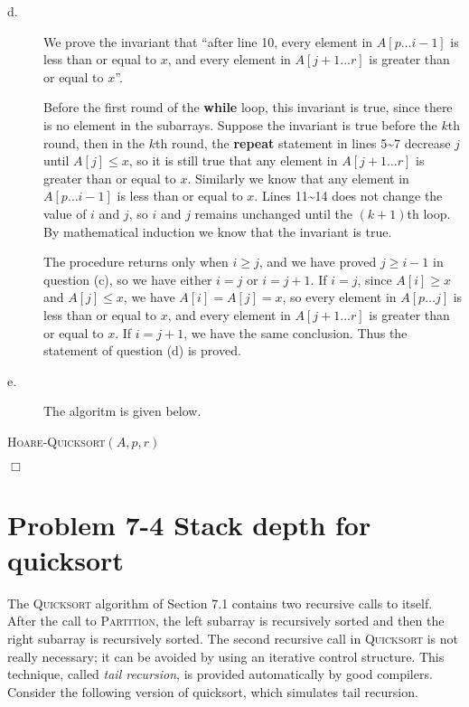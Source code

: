 \documentclass[a4paper,10pt]{article}
\newcommand{\problem}[1]{\section*{Problem #1}}
\newcommand{\qed}{\hfill \ensuremath{\Box}}
\begin{document}
\begin{description}
\item[d. \hspace{9pt}] We prove the invariant that ``after line 10, every element in $A[p \ldots i - 1]$
is less than or equal to $x$, and every element in $A[j + 1 \ldots r]$ is greater than
or equal to $x$''.

Before the first round of the \textbf{while} loop, this invariant is true, since there is no element in the
subarrays. Suppose the invariant is true before the $k$th round, then in the $k$th
round, the \textbf{repeat} statement in lines 5\textasciitilde 7 decrease $j$ until $A[j] \leq x$, so it is still
true that any element in $A[j + 1 \ldots r]$ is greater than or equal to $x$.
Similarly we know that any element in $A[p \ldots i - 1]$ is less than or equal to $x$. Lines 11\textasciitilde 14
 does not change the value of $i$ and $j$, so $i$ and $j$ remains unchanged until
the $(k + 1)$th loop. By mathematical induction we know that the invariant is true.

The procedure returns only when $i \geq j$, and we have proved $j \geq i - 1$ in question (c), so we
have either $i = j$ or $i = j + 1$. If $i = j$, since $A[i] \geq x$ and $A[j] \leq x$, 
we have $A[i] = A[j] = x$, so every element in $A[p \ldots j]$ is less than or equal to $x$,
and every element in $A[j + 1 \ldots r]$ is greater than or equal to $x$. If $i = j + 1$,
we have the same conclusion. Thus the statement of question (d) is proved.

\newpage

\item[e. \hspace{9pt}] The algoritm is given below.

\end{description}
\begin{algorithm}[H]
\caption{\textsc{Hoare-Quicksort}$(A, p, r)$}
\end{algorithm}
\qed


\problem{7-4 Stack depth for quicksort}
The \textsc{Quicksort} algorithm of Section 7.1 contains two recursive calls to itself.
After the call to \textsc{Partition}, the left subarray is recursively sorted and then the right subarray
is recursively sorted. The second recursive call in \textsc{Quicksort} is not really necessary; it can be
avoided by using an iterative control structure. This technique, called \emph{tail recursion},
is provided automatically by good compilers. Consider the following version of quicksort, which simulates tail recursion.
\end{document}
